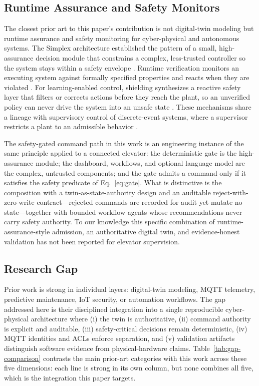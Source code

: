 \documentclass[journal]{IEEEtran}
\begin{document}
\subsection{Runtime Assurance and Safety Monitors}

The closest prior art to this paper's contribution is not digital-twin modeling but runtime assurance and safety monitoring for cyber-physical and autonomous systems. The Simplex architecture established the pattern of a small, high-assurance decision module that constrains a complex, less-trusted controller so the system stays within a safety envelope \cite{sha2001simplex}. Runtime verification monitors an executing system against formally specified properties and reacts when they are violated \cite{leucker2009runtimeVerification}. For learning-enabled control, shielding synthesizes a reactive safety layer that filters or corrects actions before they reach the plant, so an unverified policy can never drive the system into an unsafe state \cite{alshiekh2018shielding}. These mechanisms share a lineage with supervisory control of discrete-event systems, where a supervisor restricts a plant to an admissible behavior \cite{ramadge1989supervisoryControl}.

The safety-gated command path in this work is an engineering instance of the same principle applied to a connected elevator: the deterministic gate is the high-assurance module; the dashboard, workflows, and optional language model are the complex, untrusted components; and the gate admits a command only if it satisfies the safety predicate of Eq.~\eqref{eq:gate}. What is distinctive is the composition with a twin-as-state-authority design and an auditable reject-with-zero-write contract---rejected commands are recorded for audit yet mutate no state---together with bounded workflow agents whose recommendations never carry safety authority. To our knowledge this specific combination of runtime-assurance-style admission, an authoritative digital twin, and evidence-honest validation has not been reported for elevator supervision.

\subsection{Research Gap}

Prior work is strong in individual layers: digital-twin modeling, MQTT telemetry, predictive maintenance, IoT security, or automation workflows. The gap addressed here is their disciplined integration into a single reproducible cyber-physical architecture where (i) the twin is authoritative, (ii) command authority is explicit and auditable, (iii) safety-critical decisions remain deterministic, (iv) MQTT identities and ACLs enforce separation, and (v) validation artifacts distinguish software evidence from physical-hardware claims. Table~\ref{tab:gap-comparison} contrasts the main prior-art categories with this work across these five dimensions: each line is strong in its own column, but none combines all five, which is the integration this paper targets.
\end{document}
